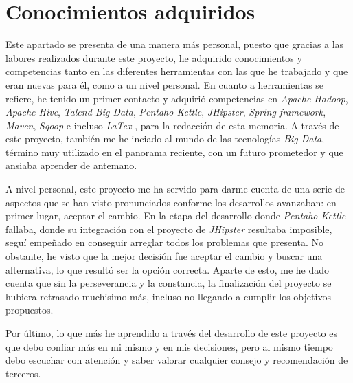 \section{Conocimientos adquiridos} \label{conclusiones.conocimientos}
Este apartado se presenta de una manera más personal, puesto que gracias a las labores realizados durante este proyecto, he adquirido conocimientos y competencias tanto en las diferentes herramientas con las que he trabajado y que eran nuevas para él, como a un nivel personal. En cuanto a herramientas se refiere, he tenido un primer contacto y adquirió competencias en \textit{Apache Hadoop}, \textit{Apache Hive}, \textit{Talend Big Data}, \textit{Pentaho Kettle}, \textit{JHipster}, \textit{Spring framework}, \textit{Maven}, \textit{Sqoop} e incluso \textit{LaTex} \cite{latex}, para la redacción de esta memoria. A través de este proyecto, también me he inciado al mundo de las tecnologías \textit{Big Data}, término muy utilizado en el panorama reciente,  con un futuro prometedor y que ansiaba aprender de antemano. 
\par 
A nivel personal, este proyecto me ha servido para darme cuenta de una serie de aspectos que se han visto pronunciados conforme los desarrollos avanzaban: en primer lugar, aceptar el cambio. En la etapa del desarrollo donde \textit{Pentaho Kettle} fallaba, donde su integración con el proyecto de \textit{JHipster} resultaba imposible, seguí empeñado en conseguir arreglar todos los problemas que presenta. No obstante, he visto que la mejor decisión fue aceptar el cambio y buscar una alternativa, lo que resultó ser la opción correcta. Aparte de esto, me he dado cuenta que sin la perseverancia y la constancia, la finalización del proyecto se hubiera retrasado muchisimo más, incluso no llegando a cumplir los objetivos propuestos. 
\par Por último, lo que más he aprendido a través del desarrollo de este proyecto es que debo confiar más en mi mismo y en mis decisiones, pero al mismo tiempo debo escuchar con atención y saber valorar cualquier consejo y recomendación de terceros. 

 
